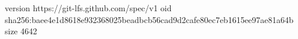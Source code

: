 version https://git-lfs.github.com/spec/v1
oid sha256:baee4e1d8618e932368025beadbcb56cad9d2cafe80ec7eb1615ee97ae81a64b
size 4642
